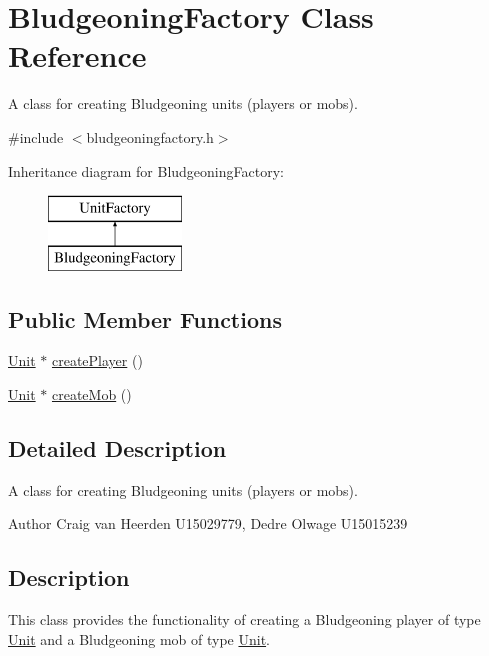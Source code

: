 \hypertarget{class_bludgeoning_factory}{\section{\-Bludgeoning\-Factory \-Class \-Reference}
\label{class_bludgeoning_factory}
}


\-A class for creating \-Bludgeoning units (players or mobs).  




{\ttfamily \#include $<$bludgeoningfactory.\-h$>$}

\-Inheritance diagram for \-Bludgeoning\-Factory\-:\begin{figure}[H]
\begin{center}
\leavevmode
\includegraphics[height=2.000000cm]{class_bludgeoning_factory}
\end{center}
\end{figure}
\subsection*{\-Public \-Member \-Functions}
\begin{DoxyCompactItemize}
\item 
\hyperlink{class_unit}{\-Unit} $\ast$ \hyperlink{class_bludgeoning_factory_adb269785fcab1a468aabe771cf4f4336}{create\-Player} ()
\item 
\hyperlink{class_unit}{\-Unit} $\ast$ \hyperlink{class_bludgeoning_factory_aaf360cac68f24499b432d8eaac411e12}{create\-Mob} ()
\end{DoxyCompactItemize}


\subsection{\-Detailed \-Description}
\-A class for creating \-Bludgeoning units (players or mobs). 

\begin{DoxyAuthor}{\-Author}
\-Craig van \-Heerden \-U15029779, \-Dedre \-Olwage \-U15015239
\end{DoxyAuthor}
\hypertarget{class_unit_factory_Description}{}\subsection{\-Description}\label{class_unit_factory_Description}
\-This class provides the functionality of creating a \-Bludgeoning player of type \hyperlink{class_unit}{\-Unit} and a \-Bludgeoning mob of type \hyperlink{class_unit}{\-Unit}. 

